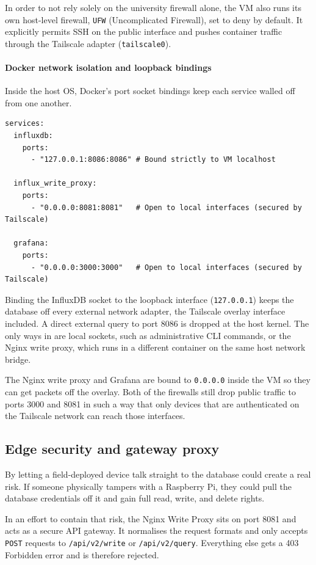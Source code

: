 In order to not rely solely on the university firewall alone, the VM also runs its own host-level firewall, \texttt{UFW} (Uncomplicated Firewall), set to deny by default. It explicitly permits SSH on the public interface and pushes container traffic through the Tailscale adapter (\texttt{tailscale0}).

\paragraph{Docker network isolation and loopback bindings}
Inside the host OS, Docker's port socket bindings keep each service walled off from one another.

\begin{verbatim}
services:
  influxdb:
    ports:
      - "127.0.0.1:8086:8086" # Bound strictly to VM localhost

  influx_write_proxy:
    ports:
      - "0.0.0.0:8081:8081"   # Open to local interfaces (secured by Tailscale)

  grafana:
    ports:
      - "0.0.0.0:3000:3000"   # Open to local interfaces (secured by Tailscale)
\end{verbatim}

Binding the InfluxDB socket to the loopback interface (\texttt{127.0.0.1}) keeps the database off every external network adapter, the Tailscale overlay interface included. A direct external query to port 8086 is dropped at the host kernel. The only ways in are local sockets, such as administrative CLI commands, or the Nginx write proxy, which runs in a different container on the same host network bridge.

The Nginx write proxy and Grafana are bound to \texttt{0.0.0.0} inside the VM so they can get packets off the overlay. Both of the firewalls still drop public traffic to ports 3000 and 8081 in such a way that only devices that are authenticated on the Tailscale network can reach those interfaces.

\subsection{Edge security and gateway proxy}

By letting a field-deployed device talk straight to the database could create a real risk. If someone physically tampers with a Raspberry Pi, they could pull the database credentials off it and gain full read, write, and delete rights.

In an effort to contain that risk, the Nginx Write Proxy sits on port 8081 and acts as a secure API gateway. It normalises the request formats and only accepts \texttt{POST} requests to \texttt{/api/v2/write} or \texttt{/api/v2/query}. Everything else gets a 403 Forbidden error and is therefore rejected.

